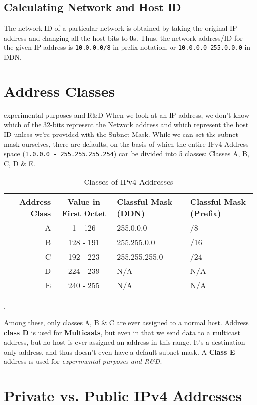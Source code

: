 \subsection{Calculating Network and Host ID}
The network ID of a particular network is obtained by taking the original IP address and changing all the host bits to \textbf{0}s. Thus, the network address/ID for the given IP address is \verb|10.0.0.0/8| in prefix notation, or \verb|10.0.0.0 255.0.0.0| in DDN. 

\section{Address Classes} experimental purposes and R\&D
When we look at an IP address, we don't know which of the 32-bits represent the Network address and which represent the host ID unless we're provided with the Subnet Mask. While we can set the subnet mask ourselves, there are defaults, on the basis of which the entire IPv4 Address space (\verb|1.0.0.0 - 255.255.255.254|) can be divided into 5 classes: Classes A, B, C, D \& E. 

\begin{table}[H]
	\centering
	\begin{tabular}{rcll}
		\toprule
		\textbf{Address Class} &\textbf{Value in First Octet} &\textbf{Classful Mask (DDN)} &Classful Mask (Prefix)\\
		\midrule
		A &1 - 126 &255.0.0.0 &/8 \\
		B &128 - 191 &255.255.0.0 &/16 \\
		C &192 - 223 &255.255.255.0 &/24 \\
		D &224 - 239 &N/A &N/A \\
		E &240 - 255 &N/A &N/A \\
		\bottomrule
	\end{tabular}
	\vspace{-5pt}
	\caption{Classes of IPv4 Addresses}.
\end{table}
\vspace{-10pt}

\noindent
Among these, only classes A, B \& C are ever assigned to a normal host. Address \textbf{class D} is used for \textbf{Multicasts}, but even in that we send data to a multicast address, but no host is ever assigned an address in this range. It's a destination only address, and thus doesn't even have a default subnet mask. A \textbf{Class E} address is used for \textit{experimental purposes and R\&D}. 

\section{Private vs. Public IPv4 Addresses}
